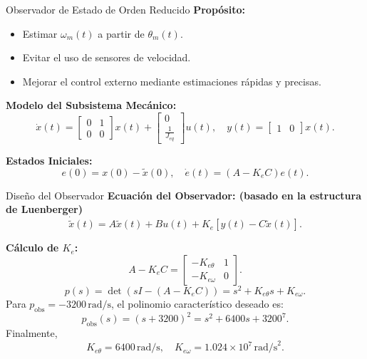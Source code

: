 \documentclass[12pt]{beamer}
\begin{document}
\begin{frame}{Observador de Estado de Orden Reducido}
\textbf{Propósito:}
\begin{itemize}
    \item Estimar \(\omega_m(t)\) a partir de \(\theta_m(t)\).
    \item Evitar el uso de sensores de velocidad.
    \item Mejorar el control externo mediante estimaciones rápidas y precisas.
\end{itemize}

\textbf{Modelo del Subsistema Mecánico:}
\[
\dot{x}(t) = 
\begin{bmatrix}
0 & 1 \\ 
0 & 0
\end{bmatrix} 
x(t) + 
\begin{bmatrix}
0 \\ 
\frac{1}{J_{eq}}
\end{bmatrix} 
u(t), \quad
y(t) = 
\begin{bmatrix}
1 & 0
\end{bmatrix} 
x(t).
\]

\textbf{Estados Iniciales:}
\[
e(0) = x(0) - \tilde{x}(0), \quad \dot{e}(t) = (A - K_eC)e(t).
\]
\end{frame}


\begin{frame}{Diseño del Observador}
\textbf{Ecuación del Observador: (basado en la estructura de Luenberger)}
\[
\dot{\tilde{x}}(t) = A \tilde{x}(t) + Bu(t) + K_e\left[y(t) - C\tilde{x}(t)\right].
\]

\textbf{Cálculo de \( K_e \):}
\[
A - K_e C = \begin{bmatrix} 
-K_{e\theta} & 1 \\ 
-K_{e\omega} & 0 
\end{bmatrix}.
\]
\[
p(s) = \det\left(sI - (A - K_e C)\right) = s^2 + K_{e\theta}s + K_{e\omega}.
\]
Para \( p_{\text{obs}} = -3200 \, \text{rad/s} \), el polinomio característico deseado es:
\[
p_{\text{obs}}(s) = (s + 3200)^2 = s^2 + 6400s + 3200^7.
\]
Finalmente,
\[
K_{e\theta} = 6400 \, \text{rad/s}, \quad K_{e\omega} = 1.024 \times 10^7 \, \text{rad/s}^2.
\]
\end{frame}
\end{document}
